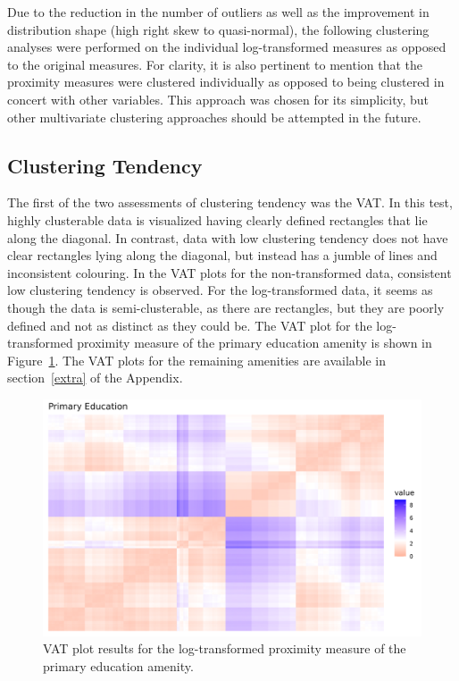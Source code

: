 \documentclass[11pt, a4paper]{article}
\begin{document}
\par
Due to the reduction in the number of outliers as well as the improvement in distribution shape (high right skew to quasi-normal), the following clustering analyses were performed on the individual log-transformed measures as opposed to the original measures. For clarity, it is also pertinent to mention that the proximity measures were clustered individually as opposed to being clustered in concert with other variables. This approach was chosen for its simplicity, but other multivariate clustering approaches should be attempted in the future. 










\subsection{Clustering Tendency}


The first of the two assessments of clustering tendency was the VAT. In this test, highly clusterable data is visualized having clearly defined rectangles that lie along the diagonal. In contrast, data with low clustering tendency does not have clear rectangles lying along the diagonal, but instead has a jumble of lines and inconsistent colouring. In the VAT plots for the non-transformed data, consistent low clustering tendency is observed. For the log-transformed data, it seems as though the data is semi-clusterable, as there are rectangles, but they are poorly defined and not as distinct as they could be. The VAT plot for the log-transformed proximity measure of the primary education amenity is shown in Figure~\ref{prieducvat}. The VAT plots for the remaining amenities are available in section~\ref{extra} of the Appendix. 




\begin{figure}[H]
\centering
\includegraphics[width=\textwidth]{./vat/primaryeducation_vat_log.png}
\caption[Primary education VAT plot]{VAT plot results for the log-transformed proximity measure of the primary education amenity.}\label{prieducvat}
\end{figure}
\end{document}

